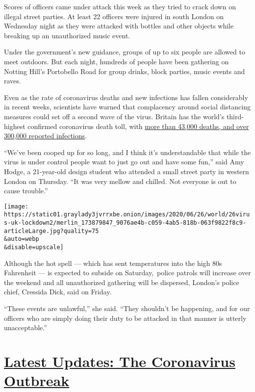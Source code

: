 Scores of officers came under attack this week as they tried to crack
down on illegal street parties. At least 22 officers were injured in
south London on Wednesday night as they were attacked with bottles and
other objects while breaking up an unauthorized music event.

Under the government's new guidance, groups of up to six people are
allowed to meet outdoors. But each night, hundreds of people have been
gathering on Notting Hill's Portobello Road for group drinks, block
parties, music events and raves.

Even as the rate of coronavirus deaths and new infections has fallen
considerably in recent weeks, scientists have warned that complacency
around social distancing measures could set off a second wave of the
virus. Britain has the world's third-highest confirmed coronavirus death
toll, with
\href{https://www.nytimes3xbfgragh.onion/interactive/2020/world/coronavirus-maps.html}{more
than 43,000 deaths, and over 300,000 reported infections}.

``We've been cooped up for so long, and I think it's understandable that
while the virus is under control people want to just go out and have
some fun,'' said Amy Hodge, a 21-year-old design student who attended a
small street party in western London on Thursday. ``It was very mellow
and chilled. Not everyone is out to cause trouble.''

\texttt{[image: https://static01.graylady3jvrrxbe.onion/images/2020/06/26/world/26virus-uk-lockdown2/merlin\_173879847\_9076ae4b-c059-4ab5-818b-063f9822f8c9-articleLarge.jpg?quality=75\\\&auto=webp\\\&disable=upscale]}

Although the hot spell --- which has sent temperatures into the high 80s
Fahrenheit --- is expected to subside on Saturday,~police patrols will
increase over the weekend and all unauthorized gathering will be
dispersed, London's police chief, Cressida Dick, said on Friday.

``These events are unlawful,'' she said. ``They shouldn't be happening,
and for our officers who are simply doing their duty to be attacked in
that manner is utterly unacceptable.''

\hypertarget{latest-updates-the-coronavirus-outbreak}{%
\section{\texorpdfstring{\href{https://www.nytimes3xbfgragh.onion/2020/08/21/world/covid-19-coronavirus.html?action=click\&pgtype=Article\&state=default\&region=MAIN_CONTENT_1\&context=storylines_live_updates}{Latest
Updates: The Coronavirus
Outbreak}}{Latest Updates: The Coronavirus Outbreak}}\label{latest-updates-the-coronavirus-outbreak}}

